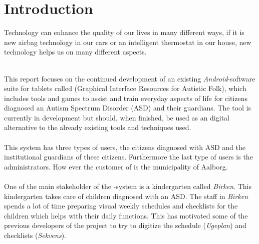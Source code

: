 \chapter{Introduction}
\label{cha:introduction}

Technology can enhance the quality of our lives in many different ways, if it is new airbag technology in our cars or an intelligent thermostat in our house, new technology helps us on many different aspects. 
\\\\

This report focuses on the continued development of an existing \emph{Android}-software suite for tablets called \giraf (Graphical Interface Resources for Autistic Folk), which includes tools and games to assist and train everyday aspects of life for citizens diagnosed an Autism Spectrum Disorder (ASD) \parencite{asd} and their guardians. The tool is currently in development but should, when finished, be used as an digital alternative to the already existing tools and techniques used. 
\\\\
This system has three types of users, the citizens diagnosed with ASD and the institutional guardians of these citizens. Furthermore the last type of users is the administrators. How ever the customer of \giraf is the municipality of Aalborg.
\\\\
One of the main stakeholder of the \giraf-system is a kindergarten called \emph{Birken}. This kindergarten takes care of children diagnosed with an ASD. The staff in \emph{Birken} spends a lot of time preparing visual weekly schedules and checklists for the children which helps with their daily functions. This has motivated some of the previous developers of the \giraf project to try to digitize the schedule (\emph{Ugeplan}) and checklists (\emph{Sekvens}). 
\\\\



